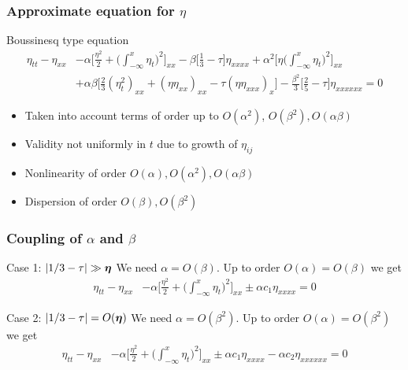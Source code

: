 \documentclass[9pt, english]{beamer}
\theoremstyle{definition}
\begin{document}
\begin{frame}
  \frametitle{Approximate equation for $\eta$}
\begin{block}{Boussinesq type equation}
{\begin{equation*}\begin{aligned} \eta_{tt}-\eta_{xx}
&-\alpha\Big[\frac{\eta^2}{2} + \Big(\int_{-\infty}^x\eta_t\Big)^2
\Big]_{xx} - \beta
\Big[\frac{1}{3} - \tau\Big]\eta_{xxxx} + \alpha^2\Big[\eta\Big(\int_{-\infty}^x\eta_t\Big)^2\Big]_{xx} \\
&+ \alpha\beta \Big[\frac{2}{3}(\eta_t^2)_{xx} +
(\eta\eta_{xx})_{xx} -\tau(\eta\eta_{xxx})_x\Big] -
\frac{\beta^2}{3}\Big[\frac{2}{5}-\tau\Big]\eta_{xxxxxx} = 0
\end{aligned}\end{equation*}}
\end{block}
\begin{itemize}
\item Taken into account terms of order up to $O(\alpha^2)$, $O(\beta^2),O(\alpha\beta)$
\item Validity not uniformly in $t$ due to growth of $\eta_{ij}$
\item Nonlinearity of order $O(\alpha),O(\alpha^2),O(\alpha\beta)$
\item Dispersion of order $O(\beta),O(\beta^2)$
\end{itemize}
\end{frame}

\begin{frame}
  \frametitle{Coupling of $\alpha$ and $\beta$}
\begin{block}{Case 1: ${\lvert{1/3-\tau}\rvert}\gg{\boldsymbol{\eta}}$}
We need $\alpha=O(\beta)$. Up to order $O(\alpha)=O(\beta)$ we get
\begin{equation*}\begin{aligned}
\eta_{tt}-\eta_{xx} &-\alpha\Big[\frac{\eta^2}{2} +
\Big(\int_{-\infty}^x\eta_t\Big)^2 \Big]_{xx} \pm \alpha c_1
\eta_{xxxx} = 0
\end{aligned}\end{equation*}
\end{block}
\begin{block}{Case 2: ${\lvert{1/3-\tau}\rvert}=O({\boldsymbol{\eta}})$}
We need $\alpha=O(\beta^2)$. Up to order $O(\alpha)=O(\beta^2)$ we
get
\begin{equation*}\begin{aligned}
\eta_{tt}-\eta_{xx} &-\alpha\Big[\frac{\eta^2}{2} +
\Big(\int_{-\infty}^x\eta_t\Big)^2 \Big]_{xx} \pm \alpha c_1
\eta_{xxxx} - \alpha c_2 \eta_{xxxxxx} = 0
\end{aligned}\end{equation*}
\end{block}
\end{frame}
\end{document}
